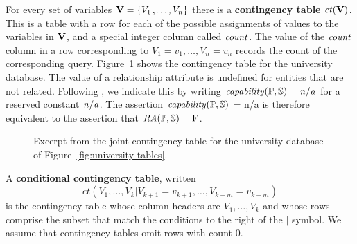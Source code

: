\documentclass{sig-alternate-2013}
\newcommand{\ct}{\mathit{ct}}
\begin{document}
For every set of variables $\set{V} = \{\V_{1}$,$\ldots,\V_{n} \}$ there is a \textbf{contingency table} $\ct(\set{V})$. %
This is a table with a row for each of the possible assignments of values to the variables in $\set{V}$, and a special integer column called $\qcount$. 
The value of the $\qcount$ column in a row 
corresponding to $V_{1} = v_{1},\ldots,V_{n} = v_{n}$ records the count of the 
corresponding query. 
Figure~\ref{fig:ct} shows the contingency table for the university database. 
The value of a relationship attribute is undefined for entities that are not related.
Following \cite{Russell2010}, %
we indicate this by writing 
$\it{capability(\P,\S)} = n/a $ for a reserved constant $\it{n/a}$. 
The assertion $\it{capability(\P,\S)}$ = n/a is therefore equivalent to the assertion that $\ra(\P,\S) = \false$.
\begin{figure}[htbp]
\begin{center}
\caption{Excerpt from the joint contingency table for the university database of Figure~\ref{fig:university-tables}. 
\label{fig:ct}}
\end{center}
\end{figure}
A \textbf{conditional contingency table}, written $$\ct(V_{1},\ldots,V_{k}|V_{k+1} = v_{k+1},\ldots, V_{k+m} = v_{k+m})$$
is the contingency table whose column headers are $V_{1},\ldots,V_{k}$ and whose rows comprise the subset that match the conditions to the right of the $\vert$ symbol.  %
We assume that contingency tables omit rows with count 0.
%

\vfill\eject
\end{document}
